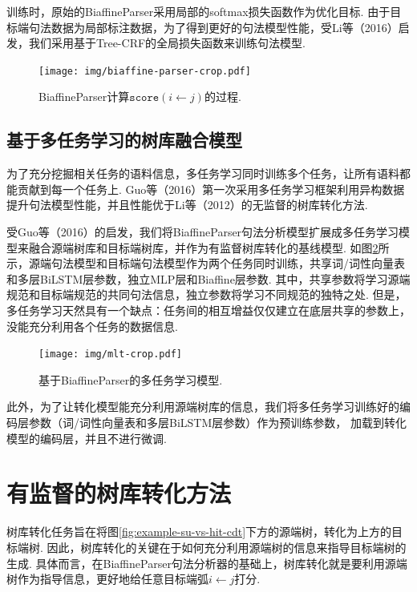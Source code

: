 训练时，原始的BiaffineParser采用局部的softmax损失函数作为优化目标.
由于目标端句法数据为局部标注数据，为了得到更好的句法模型性能，受Li等（2016）\cite{zhenghua-p16}启发，我们采用基于Tree-CRF的全局损失函数\cite{ma-xuezhe-i17-non-proj-crf}来训练句法模型.

\begin{figure}[hb!]
    \centering
    \texttt{[image: img/biaffine-parser-crop.pdf]}
    \caption{BiaffineParser计算$\texttt{score}(i \leftarrow j)$的过程. }
    \label{fig:biaffineparser}
\end{figure}

\subsection{基于多任务学习的树库融合模型}
为了充分挖掘相关任务的语料信息，多任务学习同时训练多个任务，让所有语料都能贡献到每一个任务上.
Guo等（2016）\cite{guo2016universal}第一次采用多任务学习框架利用异构数据提升句法模型性能，并且性能优于Li等（2012）\cite{li2012exploiting}的无监督的树库转化方法.

受Guo等（2016）\cite{guo2016universal}的启发，我们将BiaffineParser句法分析模型扩展成多任务学习模型来融合源端树库和目标端树库，并作为有监督树库转化的基线模型.
如图\ref{fig:mlt}所示，源端句法模型和目标端句法模型作为两个任务同时训练，共享词/词性向量表和多层BiLSTM层参数，独立MLP层和Biaffine层参数.
其中，共享参数将学习源端规范和目标端规范的共同句法信息，独立参数将学习不同规范的独特之处.
但是，多任务学习天然具有一个缺点：任务间的相互增益仅仅建立在底层共享的参数上，没能充分利用各个任务的数据信息.

\begin{figure}[hb!]
    \centering
    \texttt{[image: img/mlt-crop.pdf]}
    \caption{基于BiaffineParser的多任务学习模型. }
    \label{fig:mlt}
\end{figure}
此外，为了让转化模型能充分利用源端树库的信息，我们将多任务学习训练好的编码层参数（词/词性向量表和多层BiLSTM层参数）作为预训练参数，
加载到转化模型的编码层，并且不进行微调.

\section{有监督的树库转化方法}
树库转化任务旨在将图\ref{fig:example-su-vs-hit-cdt}下方的源端树，转化为上方的目标端树.
因此，树库转化的关键在于如何充分利用源端树的信息来指导目标端树的生成.
具体而言，在BiaffineParser句法分析器的基础上，树库转化就是要利用源端树作为指导信息，更好地给任意目标端弧$i \leftarrow j$打分.

